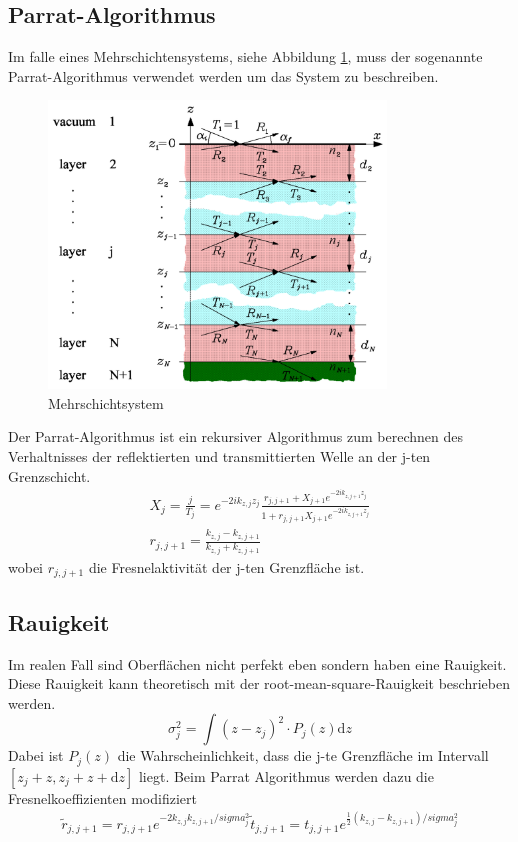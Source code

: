     \subsection{Parrat-Algorithmus}
        Im falle eines Mehrschichtensystems, siehe Abbildung \ref{fig:mehrschicht}, muss der sogenannte Parrat-Algorithmus verwendet werden um das System zu beschreiben.
        \begin{figure}[ht]
            \centering
            \includegraphics[width = 0.8\textwidth]{bilder/Mehrschichtsystem.png}
            \caption{Mehrschichtsystem}
            \label{fig:mehrschicht}
        \end{figure}
        Der Parrat-Algorithmus ist ein rekursiver Algorithmus zum berechnen des Verhaltnisses der reflektierten und transmittierten Welle an der j-ten Grenzschicht.
        \begin{align}
            X_j = \frac{j}{T_j} = e^{-2ik_{z,j}z_j} \frac{r_{j,j+1} + X_{j+1} e^{-2ik_{z,j+1}z_j}}{1 + r_{j,j+1}X_{j+1} e^{-2ik_{z,j+1}z_j}}\\
            r_{j,j+1} = \frac{k_{z,j} - k_{z,j+1}}{k_{z,j} + k_{z,j+1}}
        \end{align}
        wobei $r_{j,j+1}$ die Fresnelaktivität der j-ten Grenzfläche ist.
    \subsection{Rauigkeit}
        Im realen Fall sind Oberflächen nicht perfekt eben sondern haben eine Rauigkeit.
        Diese Rauigkeit kann theoretisch mit der root-mean-square-Rauigkeit beschrieben werden.
        \begin{equation}
            \sigma_j^2 = \int \left(z-z_j\right)^2\cdot P_j(z) \text{d}z        
        \end{equation}
        Dabei ist $P_j(z)$ die Wahrscheinlichkeit, dass die j-te Grenzfläche im Intervall $[z_j+z,z_j+z+\text{d}z]$ liegt.
        Beim Parrat Algorithmus werden dazu die Fresnelkoeffizienten modifiziert
        \begin{align}
            \tilde{r}_{j,j+1} = r_{j,j+1} e^{-2k_{z,j}k_{z,j+1}/sigma_j^2}
            \tilde{t}_{j,j+1} = t_{j,j+1} e^{ \frac{1}{2} \left(k_{z,j} -k_{z,j+1}\right)/sigma_j^2}
        \end{align}
